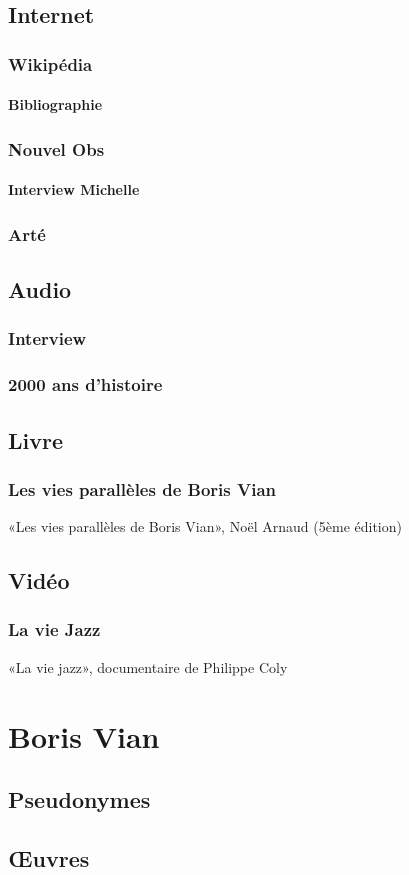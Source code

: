 \section{Internet}
\subsection{Wikipédia}
\subsubsection{Bibliographie}
\subsection{Nouvel Obs}
\subsubsection{Interview Michelle}
\subsection{Arté}
\section{Audio}
\subsection{Interview}
\subsection{2000 ans d'histoire}
\section{Livre}
\subsection{Les vies parallèles de Boris Vian}

«Les vies parallèles de Boris Vian», Noël Arnaud (5ème édition)



\section{Vidéo}
\subsection{La vie Jazz}

«La vie jazz», documentaire de Philippe Coly



\chapter{Boris Vian}
\section{Pseudonymes}
\section{Œuvres}
